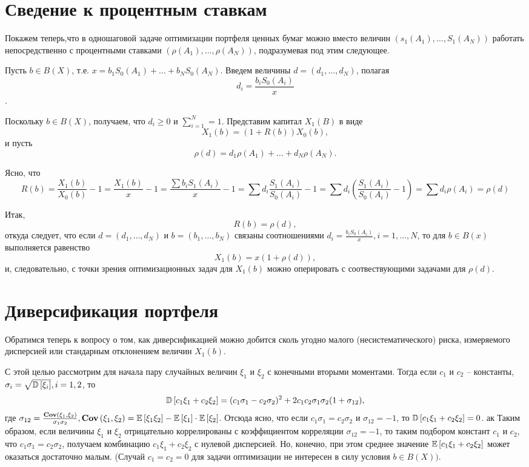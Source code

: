 \section{Сведение к процентным ставкам}

Покажем теперь,что в одношаговой задаче оптимизации портфеля ценных бумаг можно вместо величин $(s_1(A_1), \dots, S_1(A_N))$
работать непосредственно с процентными ставками $(\rho(A_1), \dots, \rho(A_N))$, подразумевая под этим следующее.

Пусть $b \in B(X)$, т.е. $x = b_1 S_0(A_1) + \dots + b_N S_0(A_N)$. Введем величины $d = (d_1, \dots, d_N)$, полагая
\[
d_i = \frac{b_i S_0(A_i)}{x}
\].

Поскольку $b \in B(X)$, получаем, что $d_i \ge 0$ и $\sum_{i=1}^{N} = 1$. Представим капитал $X_1(B)$ в виде
\[
X_1(b) = (1 + R(b))X_0(b) ,
\]
и пусть
\[
\rho(d) = d_1 \rho(A_1) + \dots + d_N \rho(A_N) .
\]

Ясно, что 
\[
R(b) = 
	\frac{X_1(b)}{X_0(b)} - 1 = 
	\frac{X_1(b)}{x} - 1 =
	\frac{\sum b_i S_1(A_i)}{x} - 1 =
	\sum d_i \frac{S_1(A_i)}{S_0(A_i)} - 1 = 
	\sum d_i \left( \frac{S_1(A_i)}{S_0(A_i)} - 1\right) =
	\sum d_i \rho(A_i) = 
	\rho(d)
\]

Итак,
\[
R(b) = \rho(d),
\]
откуда следует, что если $d = (d_1, \dots, d_N)$ и $b = (b_1, \dots, b_N)$ связаны соотношениями 
$d_i = \frac{b_i S_0(A_i)}{x}, i=1, \dots, N$, то для $b \in B(x)$ выполняется равенство
\[
X_1(b) = x(1 + \rho(d)),
\]
и, следовательно, с точки зрения оптимизационных задач для $X_1(b)$ можно оперировать с соотвествующими задачами
для $\rho(d)$.

\section{Диверсификация портфеля}

Обратимся теперь к вопросу о том, как диверсификацией можно добится сколь угодно малого (несистематического) риска, измеряемого дисперсией
или стандарным отклонением величин $X_1(b)$.

С этой целью рассмотрим для начала пару случайных величин $\xi_1$ и $\xi_2$ с конечными вторыми моментами. Тогда если $c_1$ и $c_2$ -- константы,
$\sigma_i = \sqrt{\mathbb{D}\left[\xi_i\right]}, i=1,2$, то 
\[
\mathbb{D}\left[c_1 \xi_1 + c_2 \xi_2\right] = 
	(c_1 \sigma_1 - c_2 \sigma_2)^2 + 2 c_1 c_2 \sigma_1 \sigma_2 (1 + \sigma_{12}),
\]
где $\sigma_{12} = \frac{\textbf{Cov}\left(\xi_1, \xi_2\right)}{\sigma_1 \sigma_2}, \textbf{Cov}\left(\xi_1, \xi_2\right) = \mathbb{E}\left[\xi_1 \xi_2\right] - \mathbb{E}\left[\xi_1\right] \cdot \mathbb{E}\left[\xi_2\right]$.
Отсюда ясно, что если $c_1 \sigma_1 = c_2 \sigma_2$ и $\sigma_{12} = -1$, то $\mathbb{D}\left[c_1 \xi_1 + c_2 \xi_2\right] = 0$.
ак
Таким образом, если величины $\xi_1$ и $\xi_2$ отрицательно коррелированы с коэффициентом корреляции $\sigma_{12} = -1$, то таким подбором
констант $c_1$ и $c_2$, что $c_1 \sigma_1 = c_2 \sigma_2$, получаем комбинацию $c_1 \xi_1 + c_2 \xi_2$ с нулевой дисперсией. Но,
конечно, при этом среднее значение $\mathbb{E}\left[c_1 \xi_1 + c_2 \xi_2\right]$ может оказаться достаточно малым. (Случай $c_1 = c_2 = 0$ для задачи 
оптимизации не интересен в силу условия $b \in B(X))$.

